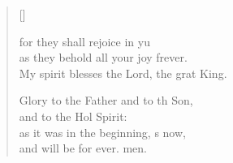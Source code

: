 \begin{verse}[\versewidth]
\begin{patverse}
for they shall rejoice in yu\Flex\\
as they behold all your joy frever.\Med\\
My spirit blesses the Lord, the grat King.

Glory to the Father and to th Son,\Med\\
and to the Hol Spirit:\\
as it was in the beginning, \pointup{\i}s now,\Med\\
and will be for ever. men.

  \end{patverse}
\end{verse}
